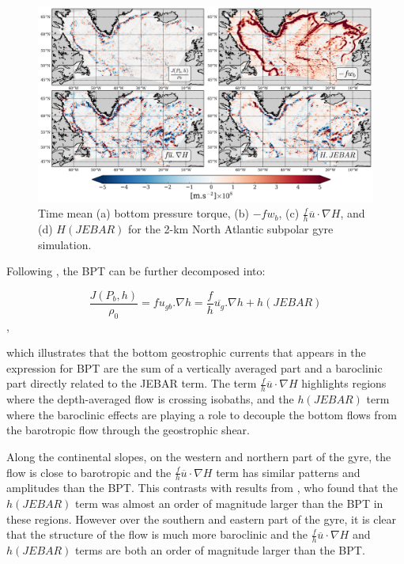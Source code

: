 \documentclass[11pt,a4paper]{article}
\begin{document}
\begin{figure}[H]
\centerline{\includegraphics[width=20cm]{./v_b/decomp_bpt.png}}
\caption{Time mean (a) bottom pressure torque, (b) $-f w_{b}$, (c) $ \frac{f}{h} \overline{u} \cdot \nabla H$, and (d) $H(JEBAR)$ for the 2-km North Atlantic subpolar gyre simulation.}
\label{decomp_bpt}
\end{figure} 

Following \citet{mertz1992,yeager2015}, the BPT can be further decomposed into:

$$\frac{J(P_b,h)}{\rho _0}=f u_{gb}.\nabla h = \frac{f}{h} \overline{u_g}.\nabla h +  h(JEBAR)$$,

which illustrates that the bottom geostrophic currents that appears in the expression for BPT are the sum of a vertically averaged part and a baroclinic part directly related to the JEBAR term. The term $ \frac{f}{h} \overline{u} \cdot \nabla H$ highlights regions where the depth-averaged flow is crossing isobaths, and the $h(JEBAR)$ term where the baroclinic effects are playing a role to decouple the bottom flows from the barotropic flow through the geostrophic shear.

Along the continental slopes, on the western and northern part of the gyre, the flow is close to barotropic and the $ \frac{f}{h} \overline{u} \cdot \nabla H$ term has similar patterns and amplitudes than the BPT. This contrasts with results from \citet{yeager2015}, who found that the $h(JEBAR)$ term was almost an order of magnitude larger than the BPT in these regions. However over the southern and eastern part of the gyre, it is clear that the structure of the flow is much more baroclinic and the $ \frac{f}{h} \overline{u} \cdot \nabla H$ and  $h(JEBAR)$ terms are both an order of magnitude larger than the BPT.
\end{document}
